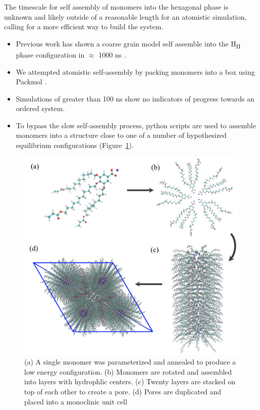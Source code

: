 \documentclass{article}
\begin{document}

  The timescale for self assembly of monomers into the hexagonal phase is
  unknown and likely outside of a reasonable length for an atomistic
  simulation, calling for a more efficient way to build the system. 
  \begin{itemize}
    \item Previous work has shown a coarse grain model self assemble into
    the H\textsubscript{II} phase configuration in $\approx$ 1000 ns \cite{mondal_self-assembly_2013}.
    \item We attempted atomistic self-assembly by packing monomers into a box 
    using Packmol \cite{martinez_packmol:_2009}.
    \item Simulations of greater than 100 ns show no indicators of progress 
    towards an ordered system.  %
    \item To bypass the slow self-assembly process, python scripts are used
    to assemble monomers into a structure close to one of a number of 
    hypothesized equilibrium configurations (Figure~\ref{fig:python}).
  \end{itemize}

  \begin{figure}
	\centering
	\includegraphics[width=0.75\linewidth]{build.PNG} %
	\caption{(a) A single monomer was parameterized and annealed to produce a low energy
		configuration. (b) Monomers are rotated and assembled into layers with 
		hydrophlic centers. (c) Twenty layers are stacked on top of each other to create
		a pore. (d) Pores are duplicated and placed into a monoclinic unit cell}\label{fig:python}
  \end{figure}
  
\end{document}
